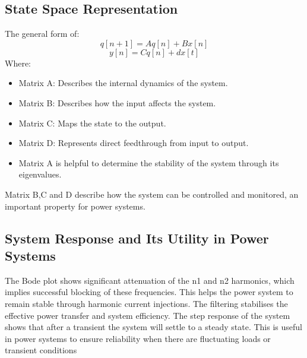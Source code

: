 \documentclass[11pt]{article}
\begin{document}
\subsection{State Space Representation}
\label{sec:org98180e3}
The general form of:
\[q[n + 1] = Aq[n] + Bx[n]\]
\[y[n] = Cq[n] + dx[t]\]
Where:
\begin{itemize}
\item Matrix A: Describes the internal dynamics of the system.
\item Matrix B: Describes how the input affects the system.
\item Matrix C: Maps the state to the output.
\item Matrix D: Represents direct feedthrough from input to output.
\item Matrix A is helpful to determine the stability of the system through its eigenvalues.
\end{itemize}
Matrix B,C and D describe how the system can be controlled and monitored, an important property for power systems.
\subsection{System Response and Its Utility in Power Systems}
\label{sec:org8ec8367}
The Bode plot shows significant attenuation of the n1 and n2 harmonics, which implies successful blocking of these frequencies. This helps the power system to remain stable through harmonic current injections. The filtering stabilises the effective power transfer and system efficiency.
The step response of the system shows that after a transient the system will settle to a steady state. This is useful in power systems to ensure reliability when there are fluctuating loads or transient conditions
\end{document}
